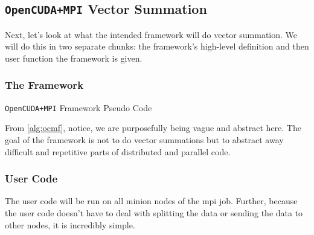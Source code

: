 \subsection{\texttt{OpenCUDA+MPI} Vector Summation}

Next, let's look at what the intended framework will do vector summation. We
will do this in two separate chunks: the framework's high-level definition and
then user function the framework is given.

\subsubsection{The Framework}

\begin{algorithm}
\begin{algorithmic}
    \EndFor{}
\EndFunction{}
\EndFunction{}
\end{algorithmic}
\label{alg:ocmf}
\caption{\texttt{OpenCUDA+MPI} Framework Pseudo Code}
\end{algorithm}

From \cref{alg:ocmf}, notice, we are purposefully being vague and abstract
here.  The goal of the framework is not to do vector summations but to abstract
away difficult and repetitive parts of distributed and parallel code.

\subsubsection{User Code}

The user code will be run on all minion nodes of the \gls{mpi} job. Further,
because the user code doesn't have to deal with splitting the data or sending
the data to other nodes, it is incredibly simple.

